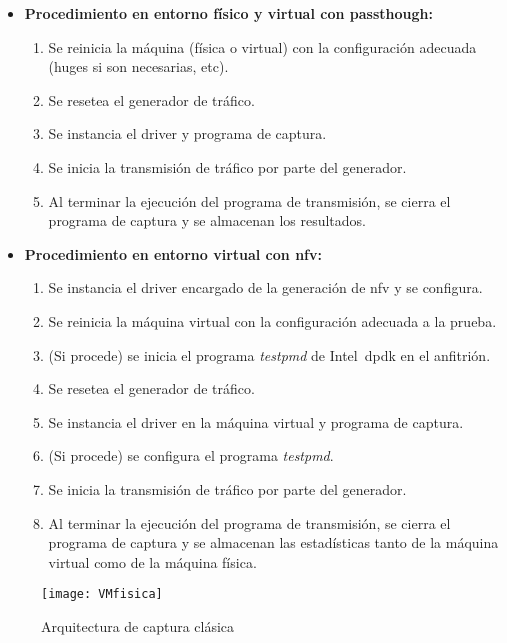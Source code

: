 \begin{itemize}
\item \textbf{Procedimiento en entorno físico y virtual con \gls{passthough}:}
\begin{enumerate}
\item Se reinicia la máquina (física o virtual) con la configuración adecuada (\glspl{huge} si son necesarias, etc).
\item Se resetea el generador de tráfico.
\item Se instancia el driver y programa de captura.
\item Se inicia la transmisión de tráfico por parte del generador.
\item Al terminar la ejecución del programa de transmisión, se cierra el programa de captura y se almacenan los resultados.
\end{enumerate}

\item \textbf{Procedimiento en entorno virtual con \gls{nfv}:}
\begin{enumerate}
\item Se instancia el driver encargado de la generación de \gls{nfv} y se configura.
\item Se reinicia la máquina virtual con la configuración adecuada a la prueba.
\item (Si procede) se inicia el programa \textit{testpmd} de Intel~\gls{dpdk} en el anfitrión.
\item Se resetea el generador de tráfico.
\item Se instancia el driver en la máquina virtual y programa de captura.
\item (Si procede) se configura el programa \textit{testpmd}.
\item Se inicia la transmisión de tráfico por parte del generador.
\item Al terminar la ejecución del programa de transmisión, se cierra el programa de captura y se almacenan las estadísticas tanto de la máquina virtual como de la máquina física.
\end{enumerate}

\end{itemize}




\begin{figure}[!htb]
\centering
\texttt{[image: VMfisica]}
\caption{Arquitectura de captura clásica}
\label{fig:vmfisica}
\end{figure}



